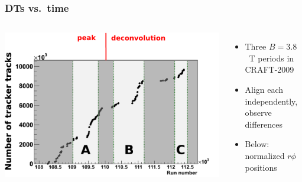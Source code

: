 \documentclass[compress]{beamer}
\begin{document}
\begin{frame}
\frametitle{DTs vs.~time}

\begin{columns}
\includegraphics[width=\linewidth]{bfield_regions.pdf}
\begin{itemize}
\item Three $B=3.8$~T periods in CRAFT-2009
\item Align each independently, observe differences
\item Below: normalized $r\phi$ positions
\end{itemize}
\end{columns}

\vfill
{}
\end{frame}
\end{document}
